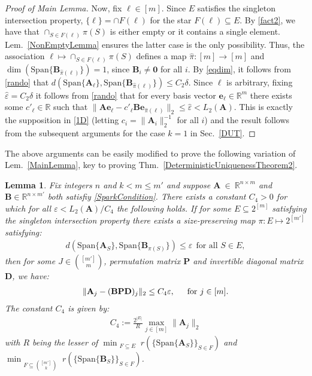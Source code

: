 \documentclass[9pt,twocolumn]{pnas-new}
\newtheorem{lemma}{Lemma}
\begin{document}
\begin{proof}[Proof of Main Lemma]
Now, fix $\ell \in [m]$. Since $E$ satisfies the singleton intersection property, $\{\ell\} = \cap F(\ell)$ for the star $F(\ell) \subseteq E$. By \eqref{fact2}, we have that $\cap_{S \in F(\ell)} \pi(S)$ is either empty or it contains a single element. Lem.~\ref{NonEmptyLemma} ensures the latter case is the only possibility. Thus, the association $\ell \mapsto \cap_{S \in F(\ell)} \pi(S)$ defines a map $\hat \pi: [m] \to [m]$ and $\dim(\text{Span}\{\mathbf{B}_{\hat \pi(\ell)}\}) = 1$, since $\mathbf{B}_i \neq \textbf{0}$ for all $i$. By \eqref{eqdim}, it follows from \eqref{rando} that $d\left( \text{Span}\{\mathbf{A}_\ell\}, \text{Span}\{ \mathbf{B}_{\hat \pi(\ell)} \} \right) \leq C_2\delta$. Since $\ell$ is arbitrary, fixing $\hat \varepsilon = C_2\delta$ it follows from \eqref{rando} that for every basis vector $\mathbf{e}_\ell \in \mathbb{R}^m$ there exists some $c'_\ell \in \mathbb{R}$ such that $\|\mathbf{A}\mathbf{e}_\ell - c'_\ell \mathbf{B}\mathbf{e}_{\hat \pi(\ell)}\|_2 \leq \hat \varepsilon < L_2(\mathbf{A})$. This is exactly the supposition in \eqref{1D} (letting $c_i = \|\mathbf{A}_i\|_2^{-1}$ for all $i$) and the result follows from the subsequent arguments for the case $k=1$ in Sec.~\ref{DUT}.
\end{proof}

The above arguments can be easily modified to prove the following variation of Lem.~\ref{MainLemma}, key to proving Thm.~\ref{DeterministicUniquenessTheorem2}. 

\begin{lemma}\label{MainLemma2}
Fix integers $n$ and $k < m \leq m'$ and suppose $\mathbf{A}~\in~\mathbb{R}^{n \times m}$ and $\mathbf{B} \in \mathbb{R}^{n \times m'}$ both satisfiy \eqref{SparkCondition}. There exists a constant $C_4 > 0$ for which for all $\varepsilon < L_2(\mathbf{A}) / C_4$ the following holds. If for some $E \subseteq2^{[m]}$ satisfying the singleton intersection property there exists a size-preserving map $\pi: E \mapsto 2^{[m']}$ satisfying:
\begin{align}\label{GapUpperBound}
d(\text{Span}\{\mathbf{A}_{S}\}, \text{Span}\{\mathbf{B}_{\pi(S)}\}) \leq \varepsilon \ \ \text{for all $S \in E$},
\end{align}
%
then for some $J \in {[m'] \choose m}$, permutation matrix $\mathbf{P}$ and invertible diagonal matrix $\mathbf{D}$, we have:
\begin{align}\label{MainLemmaBPD}
\|\mathbf{A}_j - (\mathbf{BPD})_j\|_2 \leq C_4 \varepsilon, \indent \text{for } j \in [m].
\end{align}
The constant $C_4$ is given by:
\begin{align}\label{Cdefm'}
C_4 := \frac{2^{|E|}}{R} \max_{j \in [m]} \|\mathbf{A}_j\|_2
\end{align}
%
with $R$ being the lesser of $\min_{\substack{F \subseteq E}} r( \{ \text{Span}\{\mathbf{A}_{S}\} \}_{S \in F})$ and $\min_{\substack{F \subseteq {[m'] \choose k}}} r( \{ \text{Span}\{\mathbf{B}_{S}\} \}_{S \in F})$.
\end{lemma}
\end{document}
